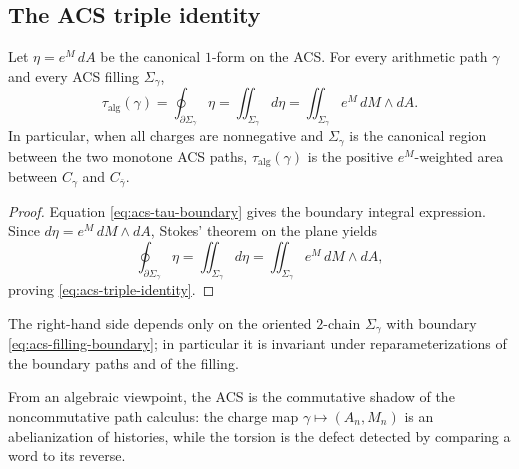 \subsection{The ACS triple identity}\label{subsec:acs-triple-identity}

\begin{theorem}\label{thm:acs-triple-identity}
Let $\eta=e^M\,dA$ be the canonical $1$-form on the ACS. For every arithmetic path $\gamma$ and every ACS filling $\Sigma_\gamma$,
\begin{equation}\label{eq:acs-triple-identity}
\tau_{\mathrm{alg}}(\gamma)
=\oint_{\partial\Sigma_\gamma}\eta
=\iint_{\Sigma_\gamma} d\eta
=\iint_{\Sigma_\gamma} e^M\,dM\wedge dA.
\end{equation}
In particular, when all charges are nonnegative and $\Sigma_\gamma$ is the canonical region between the two monotone ACS paths, $\tau_{\mathrm{alg}}(\gamma)$ is the positive $e^M$-weighted area between $C_\gamma$ and $C_{\bar\gamma}$.
\end{theorem}

\begin{proof}
Equation \eqref{eq:acs-tau-boundary} gives the boundary integral expression. Since $d\eta=e^M\,dM\wedge dA$, Stokes' theorem on the plane yields
\[
\oint_{\partial\Sigma_\gamma}\eta=\iint_{\Sigma_\gamma} d\eta
=\iint_{\Sigma_\gamma} e^M\,dM\wedge dA,
\]
proving \eqref{eq:acs-triple-identity}.
\end{proof}

The right-hand side depends only on the oriented $2$-chain $\Sigma_\gamma$ with boundary \eqref{eq:acs-filling-boundary}; in particular it is invariant under reparameterizations of the boundary paths and of the filling.

From an algebraic viewpoint, the ACS is the commutative shadow of the noncommutative path calculus: the charge map $\gamma\mapsto(A_n,M_n)$ is an abelianization of histories, while the torsion is the defect detected by comparing a word to its reverse.
